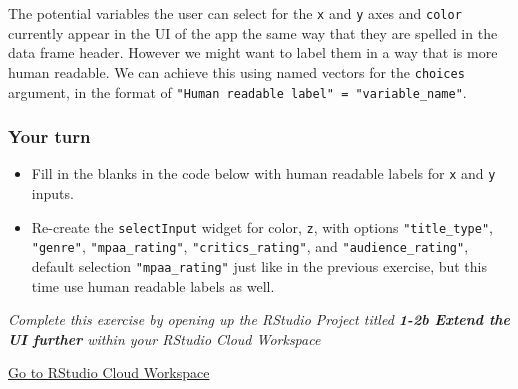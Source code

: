 \documentclass[
  letterpaper,
  DIV=11,
  numbers=noendperiod]{scrreprt}
\providecommand{\tightlist}{%
  \setlength{\itemsep}{0pt}\setlength{\parskip}{0pt}}
\begin{document}
The potential variables the user can select for the \texttt{x} and
\texttt{y} axes and \texttt{color} currently appear in the UI of the app
the same way that they are spelled in the data frame header. However we
might want to label them in a way that is more human readable. We can
achieve this using named vectors for the \texttt{choices} argument, in
the format of \texttt{"Human\ readable\ label"\ =\ "variable\_name"}.

\hypertarget{your-turn-5}{%
\subsubsection{Your turn}\label{your-turn-5}}

\begin{itemize}
\tightlist
\item
  Fill in the blanks in the code below with human readable labels for
  \texttt{x} and \texttt{y} inputs.
\item
  Re-create the \texttt{selectInput} widget for color, \texttt{z}, with
  options \texttt{"title\_type"}, \texttt{"genre"},
  \texttt{"mpaa\_rating"}, \texttt{"critics\_rating"}, and
  \texttt{"audience\_rating"}, default selection \texttt{"mpaa\_rating"}
  just like in the previous exercise, but this time use human readable
  labels as well.
\end{itemize}

\emph{Complete this exercise by opening up the RStudio Project titled
\textbf{1-2b Extend the UI further} within your RStudio Cloud Workspace}

\href{https://rstudio.cloud/spaces/81721/join?access_code=I4VJaNsKfTqR3Td9hLP7E1nz8\%2FtMg6Xbw9Bgqumv}{
Go to RStudio Cloud Workspace}
\end{document}
